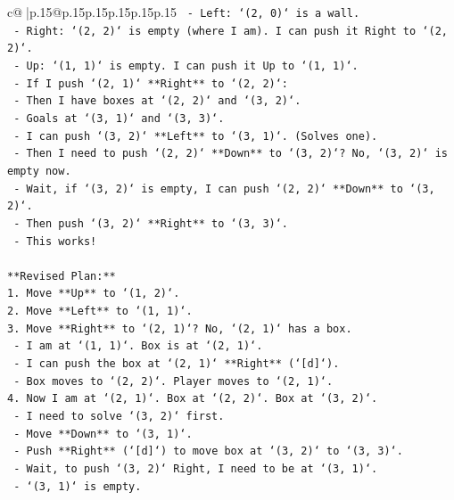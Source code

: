 \documentclass{article}
\begin{document}
{\begin{supertabular}{c@{$\;$}|p{.15\linewidth}@{}p{.15\linewidth}p{.15\linewidth}p{.15\linewidth}p{.15\linewidth}p{.15\linewidth}}
{{{\texttt{            {-}   Left: `(2, 0)` is a wall.} \\
\texttt{            {-}   Right: `(2, 2)` is empty (where I am). I can push it Right to `(2, 2)`.} \\
\texttt{            {-}   Up: `(1, 1)` is empty. I can push it Up to `(1, 1)`.} \\
\texttt{        {-}   If I push `(2, 1)` **Right** to `(2, 2)`:} \\
\texttt{            {-}   Then I have boxes at `(2, 2)` and `(3, 2)`.} \\
\texttt{            {-}   Goals at `(3, 1)` and `(3, 3)`.} \\
\texttt{            {-}   I can push `(3, 2)` **Left** to `(3, 1)`. (Solves one).} \\
\texttt{            {-}   Then I need to push `(2, 2)` **Down** to `(3, 2)`? No, `(3, 2)` is empty now.} \\
\texttt{            {-}   Wait, if `(3, 2)` is empty, I can push `(2, 2)` **Down** to `(3, 2)`.} \\
\texttt{            {-}   Then push `(3, 2)` **Right** to `(3, 3)`.} \\
\texttt{            {-}   This works!} \\
\\ 
\texttt{**Revised Plan:**} \\
\texttt{1.  Move **Up** to `(1, 2)`.} \\
\texttt{2.  Move **Left** to `(1, 1)`.} \\
\texttt{3.  Move **Right** to `(2, 1)`? No, `(2, 1)` has a box.} \\
\texttt{    {-}   I am at `(1, 1)`. Box is at `(2, 1)`.} \\
\texttt{    {-}   I can push the box at `(2, 1)` **Right** (`{[}d{]}`).} \\
\texttt{    {-}   Box moves to `(2, 2)`. Player moves to `(2, 1)`.} \\
\texttt{4.  Now I am at `(2, 1)`. Box at `(2, 2)`. Box at `(3, 2)`.} \\
\texttt{    {-}   I need to solve `(3, 2)` first.} \\
\texttt{    {-}   Move **Down** to `(3, 1)`.} \\
\texttt{    {-}   Push **Right** (`{[}d{]}`) to move box at `(3, 2)` to `(3, 3)`.} \\
\texttt{    {-}   Wait, to push `(3, 2)` Right, I need to be at `(3, 1)`.} \\
\texttt{    {-}   `(3, 1)` is empty.} \\
}}}
\end{supertabular}}
\end{document}
